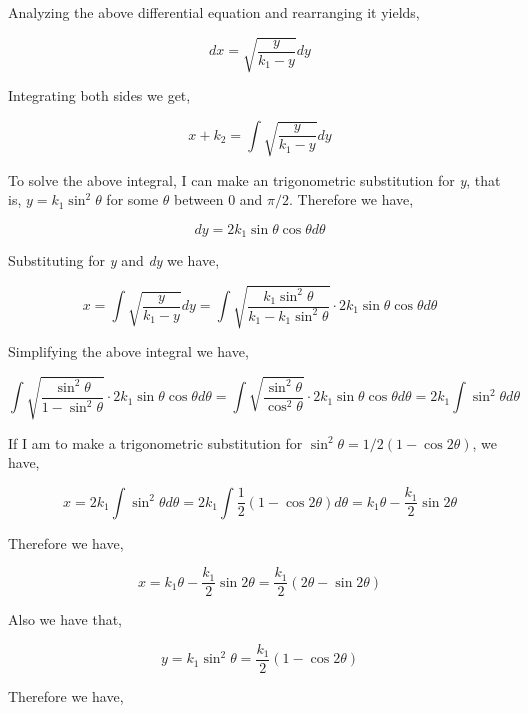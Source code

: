 	{Analyzing the above differential equation and rearranging it yields,}

		$$dx = \sqrt{\frac{y}{k_{1} - y}}dy$$

	{Integrating both sides we get,}

		$$x + k_{2} = \int\sqrt{\frac{y}{k_{1} - y}}dy$$

	{To solve the above integral, I can make an trigonometric substitution for \textit{y}, that is, $y = k_{1}\sin^2\theta$ for some $\theta$ between $0$ and $\pi/2$. Therefore we have,}

		$$dy = 2k_{1}\sin\theta\cos\theta d\theta$$

	{Substituting for \textit{y} and \textit{dy} we have,}


		$$x = \int\sqrt{\frac{y}{k_{1} - y}}dy = \int\sqrt{\frac{k_{1}\sin^2\theta}{k_{1} - k_{1}\sin^2\theta}}\cdot 2k_{1}\sin\theta\cos\theta d\theta$$

	{Simplifying the above integral we have,}

		$$\int\sqrt{\frac{\sin^2\theta}{1 - \sin^2\theta}}\cdot 2k_{1}\sin\theta\cos\theta d\theta = \int\sqrt{\frac{\sin^2\theta}{\cos^2\theta}}\cdot 2k_{1}\sin\theta\cos\theta d\theta = 2k_{1}\int\sin^2\theta d\theta$$

	{If I am to make a trigonometric substitution for $\sin^2\theta = 1/2\left(1 - \cos2\theta\right)$, we have,}


		$$x = 2k_{1}\int\sin^2\theta d\theta = 2k_{1}\int\frac{1}{2}\left(1 - \cos2\theta\right) d\theta = k_{1}\theta - \frac{k_{1}}{2}\sin2\theta$$

	{Therefore we have,}


		$$x = k_{1}\theta - \frac{k_{1}}{2}\sin2\theta = \frac{k_{1}}{2}\left(2\theta - \sin2\theta\right)$$

	{Also we have that,}

		$$y = k_{1}\sin^2\theta = \frac{k_{1}}{2}\left(1 - \cos2\theta\right)$$


	{Therefore we have,}


